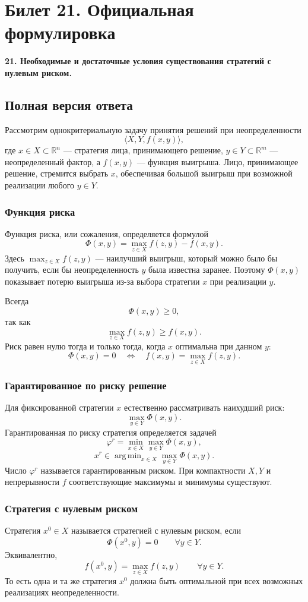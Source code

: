 \documentclass[12pt,a4paper]{article}
\newcommand{\R}{\mathbb{R}}
\DeclareMathOperator*{\argmin}{arg\,min}
\begin{document}
\section{Билет 21. Официальная формулировка}
\textbf{21. Необходимые и достаточные условия существования стратегий с нулевым риском.}

\subsection{Полная версия ответа}
Рассмотрим однокритериальную задачу принятия решений при неопределенности
\[
\langle X,Y,f(x,y)\rangle,
\]
где $x\in X\subset\R^n$ --- стратегия лица, принимающего решение, $y\in Y\subset\R^m$ --- неопределенный фактор, а $f(x,y)$ --- функция выигрыша. Лицо, принимающее решение, стремится выбрать $x$, обеспечивая большой выигрыш при возможной реализации любого $y\in Y$.

\subsubsection{Функция риска}
Функция риска, или сожаления, определяется формулой
\[
\Phi(x,y)=\max_{z\in X} f(z,y)-f(x,y).
\]
Здесь $\max_{z\in X}f(z,y)$ --- наилучший выигрыш, который можно было бы получить, если бы неопределенность $y$ была известна заранее. Поэтому $\Phi(x,y)$ показывает потерю выигрыша из-за выбора стратегии $x$ при реализации $y$.

Всегда
\[
\Phi(x,y)\ge 0,
\]
так как
\[
\max_{z\in X}f(z,y)\ge f(x,y).
\]
Риск равен нулю тогда и только тогда, когда $x$ оптимальна при данном $y$:
\[
\Phi(x,y)=0
\quad\Longleftrightarrow\quad
f(x,y)=\max_{z\in X}f(z,y).
\]

\subsubsection{Гарантированное по риску решение}
Для фиксированной стратегии $x$ естественно рассматривать наихудший риск:
\[
\max_{y\in Y}\Phi(x,y).
\]
Гарантированная по риску стратегия определяется задачей
\[
\varphi^r=\min_{x\in X}\max_{y\in Y}\Phi(x,y),
\]
\[
x^r\in \argmin_{x\in X}\max_{y\in Y}\Phi(x,y).
\]
Число $\varphi^r$ называется гарантированным риском. При компактности $X,Y$ и непрерывности $f$ соответствующие максимумы и минимумы существуют.

\subsubsection{Стратегия с нулевым риском}
Стратегия $x^0\in X$ называется стратегией с нулевым риском, если
\[
\Phi(x^0,y)=0\qquad \forall y\in Y.
\]
Эквивалентно,
\[
f(x^0,y)=\max_{z\in X}f(z,y)\qquad \forall y\in Y.
\]
То есть одна и та же стратегия $x^0$ должна быть оптимальной при всех возможных реализациях неопределенности.
\end{document}
